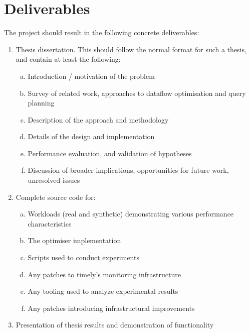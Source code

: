 \documentclass[a4paper,10pt]{article}
\begin{document}

\section{Deliverables}

The project should result in the following concrete deliverables:

\begin{enumerate}
\item Thesis dissertation. This should follow the normal format for
  such a thesis, and contain at least the following: 
  \begin{enumerate}[a.]
  \item Introduction / motivation of the problem
  \item Survey of related work, approaches to dataflow optimisation
    and query planning
  \item Description of the approach and methodology
  \item Details of the design and implementation
  \item Performance evaluation, and validation of hypotheses
  \item Discussion of broader implications, opportunities for future
    work, unresolved issues
  \end{enumerate}
  
\item Complete source code for:
  \begin{enumerate}[a.]
    \item Workloads (real and synthetic) demonstrating various
      performance characteristics
    \item The optimiser implementation
    \item Scripts used to conduct experiments
    \item Any patches to timely's monitoring infrastructure
    \item Any tooling used to analyze experimental results
    \item Any patches introducing infrastructural improvements
  \end{enumerate}

\item Presentation of thesis results and demonstration of
  functionality
\end{enumerate}

\end{document}
